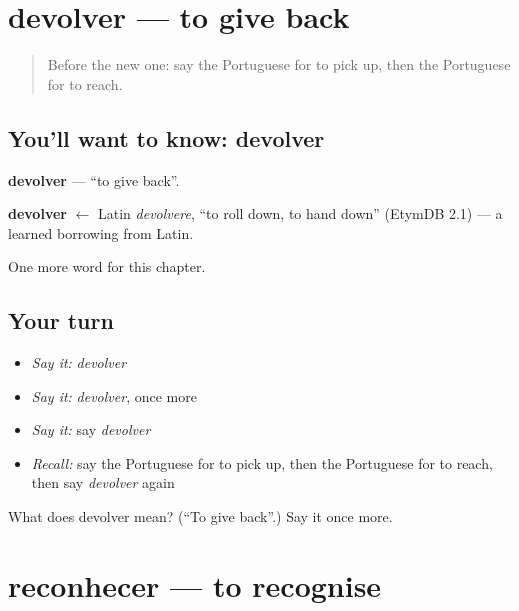 \section[devolver]{devolver — to give back}

\label{lesson:PT-C143-devolver}



\begin{quote}
Before the new one: say the Portuguese for to pick up, then the Portuguese for to reach.
\end{quote}

\subsection*{You'll want to know: devolver}
\textbf{devolver} — \textquotedblleft{}to give back\textquotedblright{}.

\begin{cousinweb}
\textbf{devolver} $\leftarrow$ Latin \emph{devolvere}, \textquotedblleft{}to roll down, to hand down\textquotedblright{} (EtymDB 2.1) — a learned borrowing from Latin.
\end{cousinweb}

\begin{grammarlens}[title={What you've built}]
One more word for this chapter.
\end{grammarlens}

\subsection*{Your turn}
\begin{itemize}
\raggedright
  \item \emph{Say it:} \emph{devolver}
  \item \emph{Say it:} \emph{devolver}, once more
  \item \emph{Say it:} say \emph{devolver}
  \item \emph{Recall:} say the Portuguese for to pick up, then the Portuguese for to reach, then say \emph{devolver} again
\end{itemize}

\begin{tcolorbox}[breakable,colback=teal!4,colframe=teal!35!black,title={Before you move on}]
What does devolver mean? (\textquotedblleft{}To give back\textquotedblright{}.) Say it once more.
\end{tcolorbox}
\section[reconhecer]{reconhecer — to recognise}

